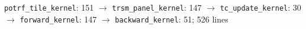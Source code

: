 \texttt{potrf\_tile\_kernel}: 151 $\to$ \texttt{trsm\_panel\_kernel}: 147 $\to$ \texttt{tc\_update\_kernel}: 30 $\to$ \texttt{forward\_kernel}: 147 $\to$ \texttt{backward\_kernel}: 51; 526 lines